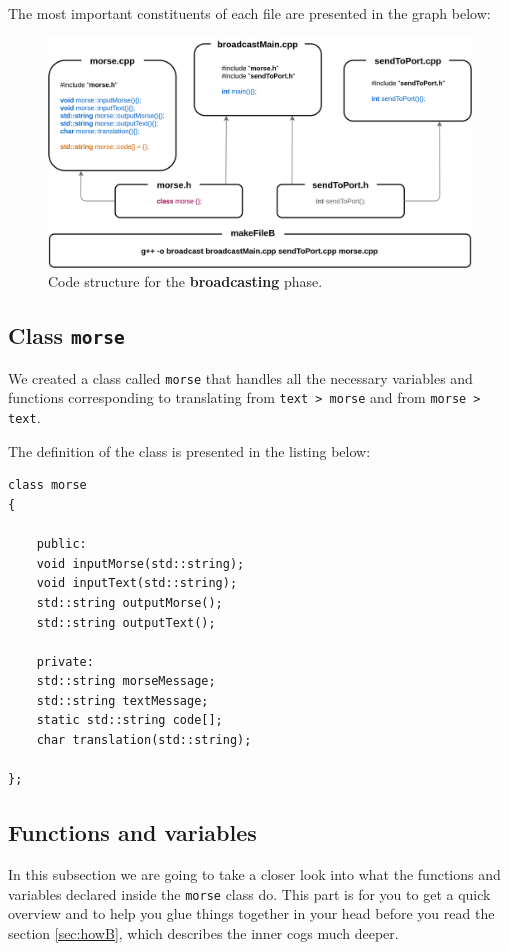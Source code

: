 \documentclass[12pt]{report}
\begin{document}
The most important constituents of each file are presented in the graph below:

\begin{figure}[H]
\centering\includegraphics[width=14.5cm]{bCodeStructure}
\caption{Code structure for the \textbf{broadcasting} phase.}				
\label{fig:br_code}
\end{figure}

\subsection{Class \texttt{morse}}

We created a class called \verb|morse| that handles all the necessary variables and functions corresponding to translating from \verb|text > morse| and from \verb|morse > text|.

The definition of the class is presented in the listing below:

\begin{lstlisting}
class morse
{

	public:
	void inputMorse(std::string);
	void inputText(std::string);
	std::string outputMorse();
	std::string outputText();

	private:
	std::string morseMessage;
	std::string textMessage;
	static std::string code[];
	char translation(std::string);

};
\end{lstlisting}

\subsection{Functions and variables}

In this subsection we are going to take a closer look into what the functions and variables declared inside the \verb|morse| class do. This part is for you to get a quick overview and to help you glue things together in your head before you read the section \ref{sec:howB}, which describes the inner cogs much deeper.
\end{document}
